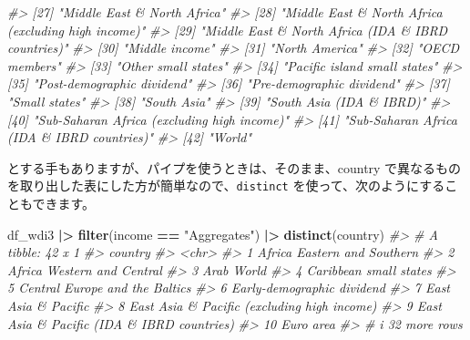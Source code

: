 \documentclass[
  xelatex, ja=standard]{bxjsbook}
\newenvironment{Shaded}{\begin{snugshade}}{\end{snugshade}}
\newcommand{\CommentTok}[1]{\textcolor[rgb]{0.56,0.35,0.01}{\textit{#1}}}
\newcommand{\FunctionTok}[1]{\textcolor[rgb]{0.13,0.29,0.53}{\textbf{#1}}}
\newcommand{\NormalTok}[1]{#1}
\newcommand{\SpecialCharTok}[1]{\textcolor[rgb]{0.81,0.36,0.00}{\textbf{#1}}}
\newcommand{\StringTok}[1]{\textcolor[rgb]{0.31,0.60,0.02}{#1}}
\theoremstyle{definition}
\theoremstyle{definition}
\theoremstyle{definition}
\theoremstyle{definition}
\theoremstyle{remark}
\begin{document}
\begin{Shaded}
\begin{Highlighting}[]
\CommentTok{\#\textgreater{} [27] "Middle East \& North Africa"                          }
\CommentTok{\#\textgreater{} [28] "Middle East \& North Africa (excluding high income)"  }
\CommentTok{\#\textgreater{} [29] "Middle East \& North Africa (IDA \& IBRD countries)"   }
\CommentTok{\#\textgreater{} [30] "Middle income"                                       }
\CommentTok{\#\textgreater{} [31] "North America"                                       }
\CommentTok{\#\textgreater{} [32] "OECD members"                                        }
\CommentTok{\#\textgreater{} [33] "Other small states"                                  }
\CommentTok{\#\textgreater{} [34] "Pacific island small states"                         }
\CommentTok{\#\textgreater{} [35] "Post{-}demographic dividend"                           }
\CommentTok{\#\textgreater{} [36] "Pre{-}demographic dividend"                            }
\CommentTok{\#\textgreater{} [37] "Small states"                                        }
\CommentTok{\#\textgreater{} [38] "South Asia"                                          }
\CommentTok{\#\textgreater{} [39] "South Asia (IDA \& IBRD)"                             }
\CommentTok{\#\textgreater{} [40] "Sub{-}Saharan Africa (excluding high income)"          }
\CommentTok{\#\textgreater{} [41] "Sub{-}Saharan Africa (IDA \& IBRD countries)"           }
\CommentTok{\#\textgreater{} [42] "World"}
\end{Highlighting}
\end{Shaded}

とする手もありますが、パイプを使うときは、そのまま、country で異なるものを取り出した表にした方が簡単なので、\texttt{distinct} を使って、次のようにすることもできます。

\begin{Shaded}
\begin{Highlighting}[]
\NormalTok{df\_wdi3 }\SpecialCharTok{|\textgreater{}} \FunctionTok{filter}\NormalTok{(income }\SpecialCharTok{==} \StringTok{"Aggregates"}\NormalTok{) }\SpecialCharTok{|\textgreater{}} \FunctionTok{distinct}\NormalTok{(country)}
\CommentTok{\#\textgreater{} \# A tibble: 42 x 1}
\CommentTok{\#\textgreater{}    country                                    }
\CommentTok{\#\textgreater{}    \textless{}chr\textgreater{}                                      }
\CommentTok{\#\textgreater{}  1 Africa Eastern and Southern                }
\CommentTok{\#\textgreater{}  2 Africa Western and Central                 }
\CommentTok{\#\textgreater{}  3 Arab World                                 }
\CommentTok{\#\textgreater{}  4 Caribbean small states                     }
\CommentTok{\#\textgreater{}  5 Central Europe and the Baltics             }
\CommentTok{\#\textgreater{}  6 Early{-}demographic dividend                 }
\CommentTok{\#\textgreater{}  7 East Asia \& Pacific                        }
\CommentTok{\#\textgreater{}  8 East Asia \& Pacific (excluding high income)}
\CommentTok{\#\textgreater{}  9 East Asia \& Pacific (IDA \& IBRD countries) }
\CommentTok{\#\textgreater{} 10 Euro area                                  }
\CommentTok{\#\textgreater{} \# i 32 more rows}
\end{Highlighting}
\end{Shaded}
\end{document}
